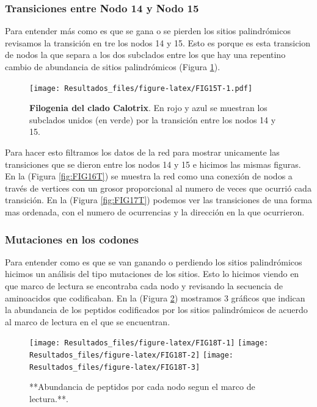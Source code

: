 \documentclass[
]{book}
\begin{document}
\hypertarget{transiciones-entre-nodo-14-y-nodo-15}{%
\subsubsection{Transiciones entre Nodo 14 y Nodo 15}\label{transiciones-entre-nodo-14-y-nodo-15}}

Para entender más como es que se gana o se pierden los sitios palindrómicos revisamos la transición en tre los nodos 14 y 15. Esto es porque es esta transicion de nodos la que separa a los dos subclados entre los que hay una repentino cambio de abundancia de sitios palindrómicos (Figura \ref{fig:FIG15T}).

\begin{figure}
\centering
\texttt{[image: Resultados\_files/figure-latex/FIG15T-1.pdf]}
\caption{\label{fig:FIG15T}\textbf{Filogenia del clado Calotrix}. En rojo y azul se muestran los subclados unidos (en verde) por la transición entre los nodos 14 y 15.}
\end{figure}

Para hacer esto filtramos los datos de la red para mostrar unicamente las transiciones que se dieron entre los nodos 14 y 15 e hicimos las mismas figuras.
En la (Figura \ref{fig:FIG16T}) se muestra la red como una conexión de nodos a través de vertices con un grosor proporcional al numero de veces que ocurrió cada transición. En la (Figura \ref{fig:FIG17T}) podemos ver las transiciones de una forma mas ordenada, con el numero de ocurrencias y la dirección en la que ocurrieron.

\hypertarget{mutaciones-en-los-codones-5}{%
\subsubsection{Mutaciones en los codones}\label{mutaciones-en-los-codones-5}}

Para entender como es que se van ganando o perdiendo los sitios palindrómicos hicimos un análisis del tipo mutaciones de los sitios. Esto lo hicimos viendo en que marco de lectura se encontraba cada nodo y revisando la secuencia de aminoacidos que codificaban. En la (Figura \ref{fig:FIG18T}) mostramos 3 gráficos que indican la abundancia de los peptidos codificados por los sitios palindrómicos de acuerdo al marco de lectura en el que se encuentran.

\begin{figure}

{\centering \texttt{[image: Resultados\_files/figure-latex/FIG18T-1]} \texttt{[image: Resultados\_files/figure-latex/FIG18T-2]} \texttt{[image: Resultados\_files/figure-latex/FIG18T-3]} 

}

\caption{**Abundancia de peptidos por cada nodo segun el marco de lectura.**.}\label{fig:FIG18T}
\end{figure}
\end{document}
